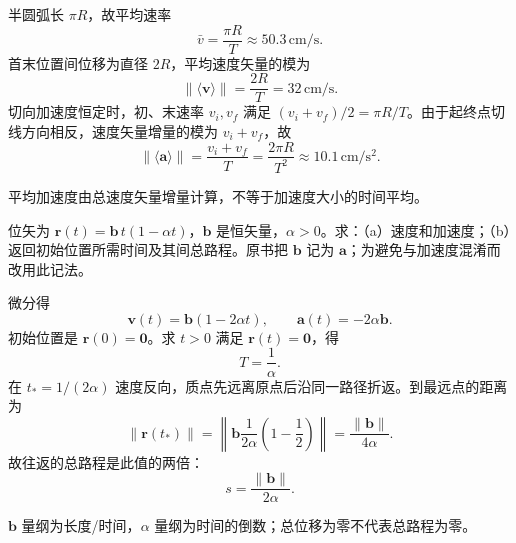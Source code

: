 \exsolution
半圆弧长 $\pi R$，故平均速率
\[
\boxed{\bar v=\frac{\pi R}{T}\approx50.3\,\mathrm{cm/s}.}
\]
首末位置间位移为直径 $2R$，平均速度矢量的模为
\[
\boxed{\lVert\langle\bm v\rangle\rVert=\frac{2R}{T}=32\,\mathrm{cm/s}.}
\]
切向加速度恒定时，初、末速率 $v_i,v_f$ 满足 $(v_i+v_f)/2=\pi R/T$。由于起终点切线方向相反，速度矢量增量的模为 $v_i+v_f$，故
\[
\boxed{\lVert\langle\bm a\rangle\rVert
=\frac{v_i+v_f}{T}
=\frac{2\pi R}{T^2}\approx10.1\,\mathrm{cm/s^2}.}
\]

\excheck
平均加速度由总速度矢量增量计算，不等于加速度大小的时间平均。


位矢为 $\bm r(t)=\bm b\,t(1-\alpha t)$，$\bm b$ 是恒矢量，$\alpha>0$。求：（a）速度和加速度；（b）返回初始位置所需时间及其间总路程。原书把 $\bm b$ 记为 $\bm a$；为避免与加速度混淆而改用此记法。

\exsolution
微分得
\[
\boxed{\bm v(t)=\bm b(1-2\alpha t),\qquad
\bm a(t)=-2\alpha\bm b.}
\]
初始位置是 $\bm r(0)=\bm0$。求 $t>0$ 满足 $\bm r(t)=\bm0$，得
\[
\boxed{T=\frac1\alpha.}
\]
在 $t_*=1/(2\alpha)$ 速度反向，质点先远离原点后沿同一路径折返。到最远点的距离为
\[
\lVert\bm r(t_*)\rVert
=\left\lVert\bm b\frac1{2\alpha}
\left(1-\frac12\right)\right\rVert
=\frac{\lVert\bm b\rVert}{4\alpha}.
\]
故往返的总路程是此值的两倍：
\[
\boxed{s=\frac{\lVert\bm b\rVert}{2\alpha}.}
\]

\excheck
$\bm b$ 量纲为长度/时间，$\alpha$ 量纲为时间的倒数；总位移为零不代表总路程为零。

